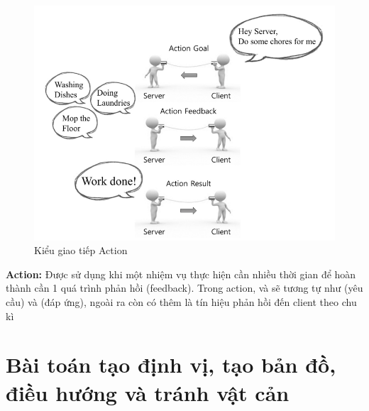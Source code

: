 \begin{figure}[htbp]
  \centering
  \includegraphics[width=0.8\linewidth]{figures/action.png}
  \caption{Kiểu giao tiếp Action}
  \label{fig:action}
\end{figure}
\textbf{Action:} Được sử dụng khi một nhiệm vụ thực hiện cần nhiều thời gian để hoàn thành cần 1 quá trình phản hồi (feedback). Trong action,  và  sẽ tương tự như  (yêu cầu) và (đáp ứng), ngoài ra còn có thêm  là tín hiệu phản hồi đến client theo chu kì




\section{Bài toán tạo định vị, tạo bản đồ, điều hướng và tránh vật cản}


